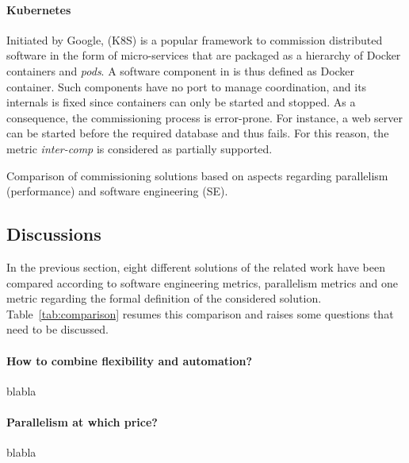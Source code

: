 \paragraph{Kubernetes}
Initiated by Google, \kubernetes (K8S) is a popular framework to
commission distributed software in the form of micro-services that are
packaged as a hierarchy of Docker containers and \emph{pods}. A
software component in \kubernetes is thus defined as Docker
container. Such components have no port to manage coordination, and
its internals is fixed since containers can only be started and
stopped. As a consequence, the commissioning process is
error-prone. For instance, a web server can be started before the
required database and thus fails. For this reason, the metric
\emph{inter-comp} is considered as partially supported.

\begin{table*}[tp]
  \centering
  \small
  
  \caption{Comparison of commissioning solutions based on aspects
  regarding parallelism (performance) and software engineering (SE).}
  \label{tab:comparison}
\end{table*}

\subsection{Discussions}

In the previous section, eight different solutions of the related work
have been compared according to software engineering metrics,
parallelism metrics and one metric regarding the formal definition of
the considered solution. Table~\ref{tab:comparison} resumes this
comparison and raises some questions that need to be discussed.

\paragraph{How to combine flexibility and automation?}
blabla

\paragraph{Parallelism at which price?}
blabla

